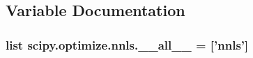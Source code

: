 \subsection{Variable Documentation}
\hypertarget{namespacescipy_1_1optimize_1_1nnls_a38ddb08a98d14b74ec00dd43c8af1ab4}{}
\subsubsection[{\+\_\+\+\_\+all\+\_\+\+\_\+}]{\setlength{\rightskip}{0pt plus 5cm}list scipy.\+optimize.\+nnls.\+\_\+\+\_\+all\+\_\+\+\_\+ = \mbox{[}'{\bf nnls}'\mbox{]}}\label{namespacescipy_1_1optimize_1_1nnls_a38ddb08a98d14b74ec00dd43c8af1ab4}
